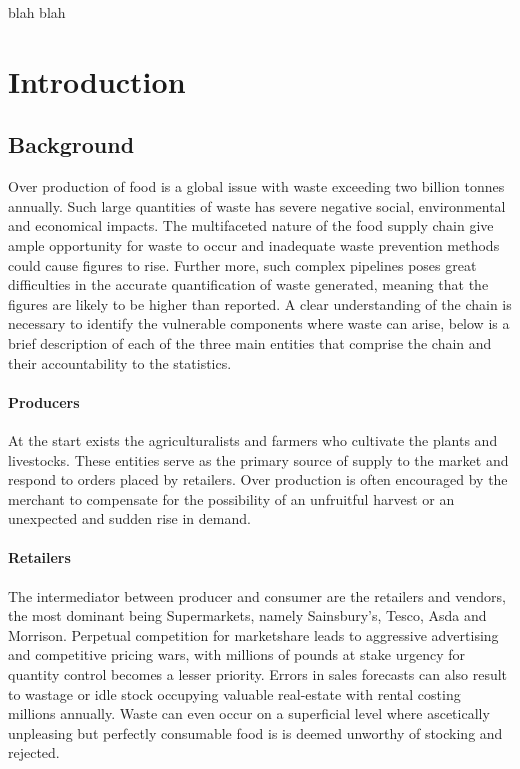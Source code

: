 \documentclass[a4paper, 11pt]{article}
\begin{document}
\clearpage
blah blah
\clearpage

\section{Introduction}

\subsection{Background}
Over production of food is a global issue with waste exceeding two billion tonnes annually\cite{waste}. Such large quantities of waste has severe negative social, environmental and economical impacts. The multifaceted nature of the food supply chain give ample opportunity for waste to occur and inadequate waste prevention methods could cause figures to rise. Further more, such complex pipelines poses great difficulties in the accurate quantification of waste generated, meaning that the figures are likely to be higher than reported.\cite{waste} A clear understanding of the chain is necessary to identify the vulnerable components where waste can arise, below is a brief description of each of the three main entities that comprise the chain and their accountability to the statistics.

\paragraph{Producers}At the start exists the agriculturalists and farmers who cultivate the plants and livestocks. These entities serve as the primary source of supply to the market and respond to orders placed by retailers. Over production is often encouraged by the merchant to compensate for the possibility of an unfruitful harvest or an unexpected and sudden rise in demand.\cite{waste}

\paragraph{Retailers}The intermediator between producer and consumer are the retailers and vendors, the most dominant being Supermarkets, namely Sainsbury's, Tesco, Asda and Morrison. Perpetual competition for marketshare leads to aggressive advertising and competitive pricing wars, with millions of pounds at stake urgency for quantity control becomes a lesser priority. Errors in sales forecasts can also result to wastage or idle stock occupying valuable real-estate with rental costing millions annually. Waste can even occur on a superficial level where ascetically unpleasing but perfectly consumable food is is deemed unworthy of stocking and rejected.
\end{document}
